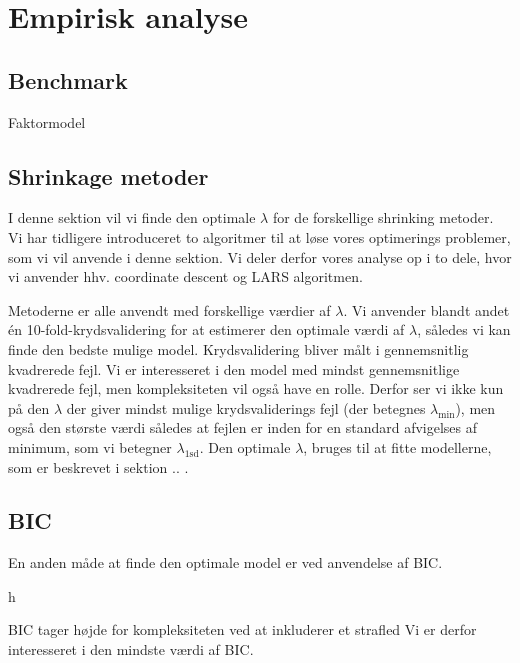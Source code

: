 \chapter{Empirisk analyse}
 
\section{Benchmark}
Faktormodel


\section{Shrinkage metoder}
I denne sektion vil vi finde den optimale $\lambda$ for de forskellige shrinking metoder. 
Vi har tidligere introduceret to algoritmer til at løse vores optimerings problemer, som vi vil anvende i denne sektion.
Vi deler derfor vores analyse op i to dele, hvor vi anvender hhv. coordinate descent og LARS algoritmen.

Metoderne er alle anvendt med forskellige værdier af $\lambda$. 
Vi anvender blandt andet én 10-fold-krydsvalidering for at estimerer den optimale værdi af $\lambda$, således vi kan finde den bedste mulige model. 
Krydsvalidering bliver målt i gennemsnitlig kvadrerede fejl. 
Vi er interesseret i den model med mindst gennemsnitlige kvadrerede fejl, men kompleksiteten vil også have en rolle.
Derfor ser vi ikke kun på den $\lambda$ der giver mindst mulige krydsvaliderings fejl (der betegnes $\lambda_{\min}$), men også den største værdi således at fejlen er inden for en standard afvigelses af minimum, som vi betegner $\lambda_{\text{1sd}}$.  
Den optimale $\lambda$, bruges til at fitte modellerne, som er beskrevet i sektion .. .  





\section{BIC}
En anden måde at finde den optimale model er ved anvendelse af BIC. 
\begin{defn}[BIC]
h
\end{defn}


BIC tager højde for kompleksiteten ved at inkluderer et strafled
Vi er derfor interesseret i den mindste værdi af BIC. 
